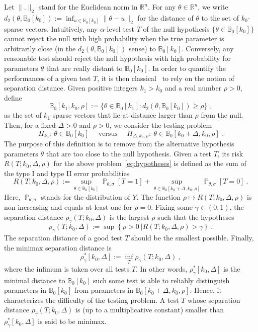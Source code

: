 \documentclass[twoside,11pt]{article}
\def\beq{\begin{equation}}
\def\eeq{\end{equation}}
\def\bbB{\mathbb{B}}
\def\bbR{\mathbb{R}}
\renewcommand{\P}{\operatorname{\mathbb{P}}}
\newcommand{\<}{\langle}
\renewcommand{\>}{\rangle}
\begin{document}
Let $\|.\|_2$ stand for the Euclidean norm in $\bbR^n$. 
For any $\theta\in \mathbb{R}^n$, we write $d_2(\theta,\bbB_0[k_0]) := \inf_{u \in \bbB_0[k_0]} \|\theta - u\|_2$ for the distance of $\theta$ to the set of $k_0$-sparse vectors. Intuitively, any $\alpha$-level test $T$ of the null hypothesis 
$\{\theta \in \mathbb B_0[k_0]\}$ cannot reject the null with high probability when the true parameter is  arbitrarily close (in the $d_2(\theta,\bbB_0[k_0])$ sense)  to  $\bbB_0[k_0]$. Conversely, any reasonable test should reject the null hypothesis with high probability for parameters $\theta$ that are really distant  to $\bbB_0[k_0]$. In order to quantify the performances of a given test $T$, it is then classical~\cite{baraud02,ingster2012nonparametric} to rely on the notion of separation distance. Given positive integers $k_1>k_0$ and a real number $\rho>0$, define 
\beq\label{eq:defB1}
\bbB_0[k_1,k_0,\rho] := \{ \theta \in \bbB_0[k_1] : d_2(\theta,\bbB_0[k_0]) \geq \rho\}\ ,
\eeq
as the set of $k_1$-sparse vectors that lie at distance larger than $\rho$ from the null. Then, for a fixed $\Delta>0$ and $\rho>0$, we consider the testing problem 
\beq\label{eq:hypotheses}
 H_{k_0}: \ \theta\in \bbB_0[k_0]\quad \text{ versus }\quad  H_{\Delta,k_0,\rho}:\ \theta \in \bbB_0[k_0+\Delta,k_0,\rho]\ .
\eeq
The purpose of this definition is to remove from the alternative hypothesis parameters $\theta$ that are too close to the null hypothesis. 
Given a  test $T$, its risk $R(T;k_0,\Delta,\rho)$ for the above problem~\eqref{eq:hypotheses} is defined as the sum of the type I and type II error probabilities 
\beq\label{eq:risk}
R(T;k_0,\Delta,\rho):= \sup_{\theta \in \bbB_0[k_0]}\P_{\theta,\sigma}[T=1] +  \sup_{\theta \in \bbB_0[k_0+\Delta,k_0,\rho]}\P_{\theta,\sigma}[T=0]\ . 
\eeq
Here, $\P_{\theta,\sigma}$ stands for the distribution of $Y$. The function $\rho\mapsto R(T;k_0,\Delta,\rho)$ is non-increasing and equals at least one for $\rho=0$. 
Fixing some $\gamma\in (0,1)$, the separation distance 
$\rho_\gamma(T;k_0,\Delta)$ is the largest $\rho$ such that the hypotheses 
\beq\label{eq:separation}
\rho_{\gamma}(T;k_0,\Delta):= \sup \left\{\rho>0\ |R(T;k_0,\Delta,\rho)>\gamma\right\}\ . 
\eeq
The separation distance of a good test $T$ should be the smallest possible. 
Finally, the minimax separation distance is
\beq\label{eq:separationkvminmax}
\rho^*_{\gamma}[k_0,\Delta]:= \inf_{T}\rho_{\gamma}(T;k_0,\Delta )\ ,
\eeq
where the infimum is taken over all tests $T$. 
In other words, $\rho^*_{\gamma}[k_0,\Delta]$ is the minimal distance to $\bbB_0[k_0]$ such some  test is able to  reliably distinguish parameters in $\bbB_0[k_0]$ from parameters in $\bbB_0[k_0+\Delta,k_0,\rho]$. Hence, it characterizes the difficulty of the testing problem. 
A test $T$ whose separation distance $\rho_{\gamma}(T;k_0,\Delta)$ is (up to a multiplicative constant) smaller than $\rho^*_{\gamma}[k_0,\Delta]$ is said to be minimax. 
\end{document}

